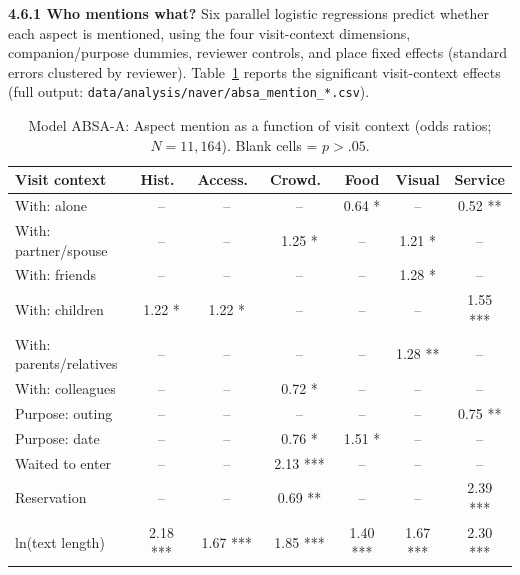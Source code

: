\documentclass[10pt,a4paper]{article}
\begin{document}
\textbf{4.6.1 Who mentions what?} Six parallel logistic regressions
predict whether each aspect is mentioned, using the four visit-context
dimensions, companion/purpose dummies, reviewer controls, and place
fixed effects (standard errors clustered by reviewer). Table~\ref{tab:absaA}
reports the significant visit-context effects (full output:
\texttt{data/analysis/naver/absa\_mention\_*.csv}).

\begin{table}[H]\centering
\caption{Model ABSA-A: Aspect mention as a function of visit context (odds ratios; $N=11{,}164$). Blank cells = $p>.05$.}
\label{tab:absaA}
\footnotesize
\setlength{\tabcolsep}{3pt}
\begin{tabular}{@{}lcccccc@{}}
\toprule
Visit context                  & Hist.\     & Access.\   & Crowd.\    & Food       & Visual     & Service    \\
\midrule
With: alone                     & --         & --         & --         & 0.64 *      & --         & 0.52 **     \\
With: partner/spouse            & --         & --         & 1.25 *      & --         & 1.21 *      & --         \\
With: friends                   & --         & --         & --         & --         & 1.28 *      & --         \\
With: children                  & 1.22 *      & 1.22 *      & --         & --         & --         & 1.55 ***    \\
With: parents/relatives         & --         & --         & --         & --         & 1.28 **     & --         \\
With: colleagues                & --         & --         & 0.72 *      & --         & --         & --         \\
Purpose: outing                 & --         & --         & --         & --         & --         & 0.75 **     \\
Purpose: date                   & --         & --         & 0.76 *      & 1.51 *      & --         & --         \\
Waited to enter                 & --         & --         & 2.13 ***    & --         & --         & --         \\
Reservation                     & --         & --         & 0.69 **     & --         & --         & 2.39 ***    \\
\midrule
ln(text length)                 & 2.18 ***    & 1.67 ***    & 1.85 ***    & 1.40 ***    & 1.67 ***    & 2.30 ***    \\

\end{tabular}
\end{table}
\end{document}
